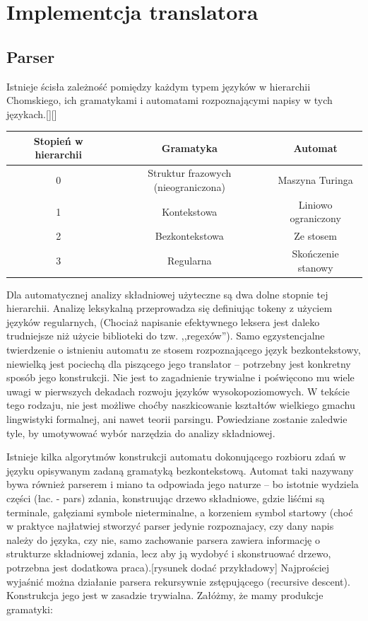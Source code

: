 \chapter{Implementcja translatora}
\section{Parser}
Istnieje ścisła zależność pomiędzy każdym typem języków w hierarchii Chomskiego, ich gramatykami i automatami rozpoznającymi napisy w tych językach.[][]
\begin{center}
\begin{tabular}{|c|c|c|}
\hline
\textbf{Stopień w hierarchii} & \textbf{Gramatyka} & \textbf{Automat} \\ \hline
0 & Struktur frazowych (nieograniczona) & Maszyna Turinga \\ \hline
1 & Kontekstowa & Liniowo ograniczony\\ \hline
2 & Bezkontekstowa & Ze stosem\\ \hline
3 & Regularna & Skończenie stanowy\\ \hline
\end{tabular}
\end{center}

Dla automatycznej analizy składniowej użyteczne są dwa dolne stopnie tej hierarchii. Analizę leksykalną przeprowadza się definiując tokeny z użyciem języków regularnych, (Chociaż napisanie efektywnego leksera jest daleko trudniejsze niż użycie biblioteki do tzw. ,,regexów'').
Samo egzystencjalne twierdzenie o istnieniu automatu ze stosem rozpoznającego język bezkontekstowy, niewielką jest pociechą dla piszącego jego translator – potrzebny jest konkretny sposób jego konstrukcji. Nie jest to zagadnienie trywialne i poświęcono mu wiele uwagi w pierwszych dekadach rozwoju języków wysokopoziomowych. W tekście tego rodzaju, nie jest możliwe choćby naszkicowanie kształtów wielkiego gmachu lingwistyki formalnej, ani nawet teorii parsingu. Powiedziane zostanie zaledwie tyle, by umotywować wybór narzędzia do analizy składniowej.

Istnieje kilka algorytmów konstrukcji automatu dokonującego rozbioru zdań w języku opisywanym zadaną gramatyką bezkontekstową. Automat taki nazywany bywa również parserem i miano ta odpowiada jego naturze – bo istotnie wydziela części (łac. - pars) zdania, konstruując drzewo składniowe, gdzie liśćmi są terminale, gałęziami symbole nieterminalne, a korzeniem symbol startowy (choć w praktyce najłatwiej stworzyć parser jedynie rozpoznajacy, czy dany napis należy do języka, czy nie, samo zachowanie parsera zawiera informację o strukturze składniowej zdania, lecz aby ją wydobyć i skonstruować drzewo, potrzebna jest dodatkowa praca).[rysunek dodać przykładowy]
Najprościej wyjaśnić można działanie parsera rekursywnie zstępującego (recursive descent). Konstrukcja jego jest w zasadzie trywialna. Załóżmy, że mamy produkcje gramatyki:


